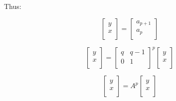 \documentclass[paper.tex]{subfiles}
\begin{document}
Thus:

\[
\left[ \begin{array}{ccc}
y \\
x \\
\end{array} \right]
=
\left[ \begin{array}{ccc}
a_{p+1} \\
a_{p} \\
\end{array} \right]
\]

\[
\left[ \begin{array}{ccc}
y \\
x \\
\end{array} \right]
=
\left[ \begin{array}{ccc}
q & q-1 \\
0 & 1 \\
\end{array} \right] ^{p}
\left[ \begin{array}{ccc}
y \\
x \\
\end{array} \right]
\]

\[
\left[ \begin{array}{ccc}
y \\
x \\
\end{array} \right]
=
A^{p}
\left[ \begin{array}{ccc}
y \\
x \\
\end{array} \right]
\]
\end{document}
